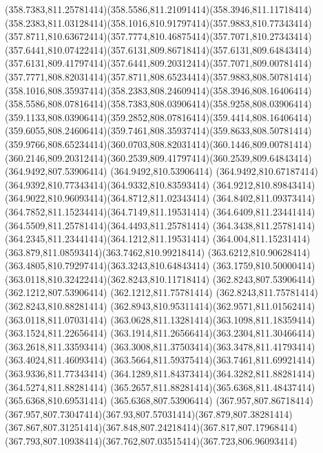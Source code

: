 {{	\curveto(358.7383,811.25781414)(358.5586,811.21091414)(358.3946,811.11718414)
	\curveto(358.2383,811.03128414)(358.1016,810.91797414)(357.9883,810.77343414)
	\curveto(357.8711,810.63672414)(357.7774,810.46875414)(357.7071,810.27343414)
	\curveto(357.6441,810.07422414)(357.6131,809.86718414)(357.6131,809.64843414)
	\curveto(357.6131,809.41797414)(357.6441,809.20312414)(357.7071,809.00781414)
	\curveto(357.7771,808.82031414)(357.8711,808.65234414)(357.9883,808.50781414)
	\curveto(358.1016,808.35937414)(358.2383,808.24609414)(358.3946,808.16406414)
	\curveto(358.5586,808.07816414)(358.7383,808.03906414)(358.9258,808.03906414)
	\curveto(359.1133,808.03906414)(359.2852,808.07816414)(359.4414,808.16406414)
	\curveto(359.6055,808.24606414)(359.7461,808.35937414)(359.8633,808.50781414)
	\curveto(359.9766,808.65234414)(360.0703,808.82031414)(360.1446,809.00781414)
	\curveto(360.2146,809.20312414)(360.2539,809.41797414)(360.2539,809.64843414)
	\closepath
	\moveto(364.9492,807.53906414)
	\lineto(364.9492,810.53906414)
	\curveto(364.9492,810.67187414)(364.9392,810.77343414)(364.9332,810.83593414)
	\curveto(364.9212,810.89843414)(364.9022,810.96093414)(364.8712,811.02343414)
	\curveto(364.8402,811.09373414)(364.7852,811.15234414)(364.7149,811.19531414)
	\curveto(364.6409,811.23441414)(364.5509,811.25781414)(364.4493,811.25781414)
	\curveto(364.3438,811.25781414)(364.2345,811.23441414)(364.1212,811.19531414)
	\curveto(364.004,811.15231414)(363.879,811.08593414)(363.7462,810.99218414)
	\curveto(363.6212,810.90628414)(363.4805,810.79297414)(363.3243,810.64843414)
	\curveto(363.1759,810.50000414)(363.0118,810.32422414)(362.8243,810.11718414)
	\lineto(362.8243,807.53906414)
	\lineto(362.1212,807.53906414)
	\lineto(362.1212,811.75781414)
	\lineto(362.8243,811.75781414)
	\lineto(362.8243,810.88281414)
	\curveto(362.8943,810.95311414)(362.9571,811.01562414)(363.0118,811.07031414)
	\curveto(363.0628,811.13281414)(363.1098,811.18359414)(363.1524,811.22656414)
	\curveto(363.1914,811.26566414)(363.2304,811.30466414)(363.2618,811.33593414)
	\curveto(363.3008,811.37503414)(363.3478,811.41793414)(363.4024,811.46093414)
	\curveto(363.5664,811.59375414)(363.7461,811.69921414)(363.9336,811.77343414)
	\curveto(364.1289,811.84373414)(364.3282,811.88281414)(364.5274,811.88281414)
	\curveto(365.2657,811.88281414)(365.6368,811.48437414)(365.6368,810.69531414)
	\lineto(365.6368,807.53906414)
	\closepath
	\moveto(367.957,807.86718414)
	\curveto(367.957,807.73047414)(367.93,807.57031414)(367.879,807.38281414)
	\curveto(367.867,807.31251414)(367.848,807.24218414)(367.817,807.17968414)
	\curveto(367.793,807.10938414)(367.762,807.03515414)(367.723,806.96093414)
}}
